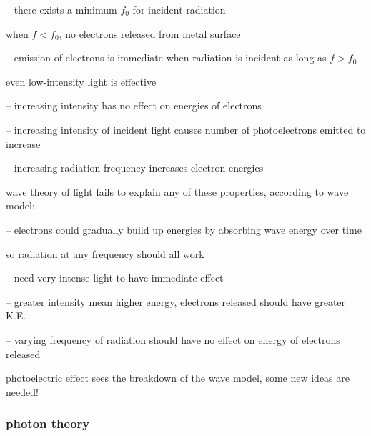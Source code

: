 \begin{compactitem}
	\item[--] there exists a minimum  $f_0$ for incident radiation
	
	when $f<f_0$, no electrons released from metal surface
	
	\item[--] emission of electrons is immediate when radiation is incident as long as $f>f_0$
	
	even low-intensity light is effective
	
	\item[--] increasing intensity has no effect on energies of electrons
	
	\item[--] increasing intensity of incident light causes number of photoelectrons emitted to increase
	
	\item[--] increasing radiation frequency increases electron energies
\end{compactitem}

\cmt wave theory of light fails to explain any of these properties, according to wave model:

\begin{compactitem}
	
	\item[--] electrons could gradually build up energies by absorbing wave energy over time
	
	so radiation at any frequency should all work 
	
	
	\item[--] need very intense light to have immediate effect
	
	\item[--] greater intensity mean higher energy, electrons released should have greater K.E.
	
	\item[--] varying frequency of radiation should have no effect on energy of electrons released
\end{compactitem}

photoelectric effect sees the breakdown of the wave model, some new ideas are needed!

\newpage






\subsubsection{photon theory}

